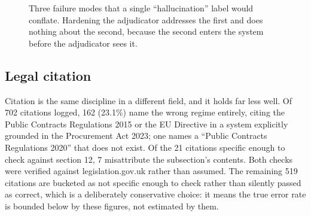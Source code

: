 \begin{figure}[htbp]
\centering
{}
\caption[Failure mode taxonomy]{Three failure modes that a single ``hallucination''
label would conflate. Hardening the adjudicator addresses the first and does
nothing about the second, because the second enters the system before the
adjudicator sees it.}
\label{fig:failures}
\end{figure}

\subsection{Legal citation}
\label{sec:citation}

Citation is the same discipline in a different field, and it holds far less well.
Of 702 citations logged, 162 (23.1\%) name the wrong regime entirely, citing the
Public Contracts Regulations 2015 or the EU Directive in a system explicitly
grounded in the Procurement Act 2023; one names a ``Public Contracts Regulations
2020'' that does not exist. Of the 21 citations specific enough to check against
section 12, 7 misattribute the subsection's contents. Both checks were verified
against legislation.gov.uk rather than assumed. The remaining 519 citations are
bucketed as not specific enough to check rather than silently passed as correct,
which is a deliberately conservative choice: it means the true error rate is
bounded below by these figures, not estimated by them.

